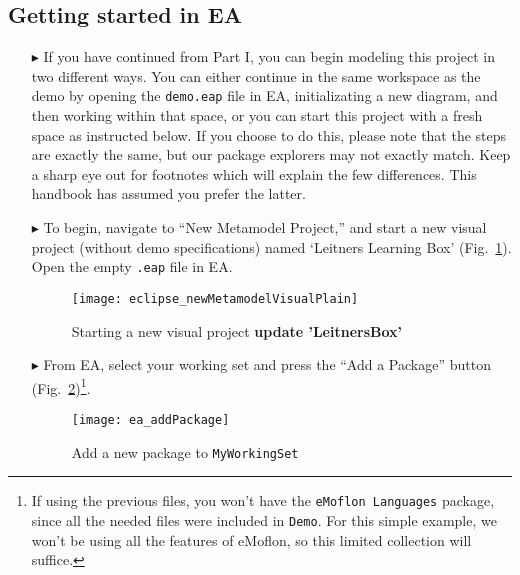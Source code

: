 \subsection{Getting started in EA}
\visHeader
\hypertarget{static:starting vis}{}

\begin{itemize}
\item[$\blacktriangleright$]  If you have continued from Part I, you can begin modeling this project in two different ways. You can either continue in the same
workspace as the demo by opening the \texttt{demo.eap} file in EA, initializating a new diagram, and then working within that space, or you can start this
project with a fresh space as instructed below. If you choose to do this, please note that the steps are exactly the same, but our package explorers may not
exactly match. Keep a sharp eye out for footnotes which will explain the few differences. This handbook has assumed you prefer the latter.

\item[$\blacktriangleright$]  To begin, navigate to ``New Metamodel Project,'' and start a new visual project (without demo specifications) named `Leitners
Learning Box' (Fig.~\ref{fig:new_visModel}). Open the empty \texttt{.eap} file in EA.

\begin{figure}[htbp]
	\centering
  \texttt{[image: eclipse\_newMetamodelVisualPlain]}
	\caption{Starting a new visual project {\bf update 'LeitnersBox'}}
	\label{fig:new_visModel}
\end{figure}

\newpage

\item[$\blacktriangleright$] From EA, select your working set and press the ``Add a Package'' button (Fig.~\ref{fig:new_package})\footnote{If using the previous
files, you won't have the \texttt{eMoflon Languages} package, since all the needed files were included in \texttt{Demo}. For this simple example, we won't be
using all the features of eMoflon, so this limited collection will suffice.}.

\begin{figure}[htbp]
	\centering
  \texttt{[image: ea\_addPackage]}
	\caption{Add a new package to \texttt{MyWorkingSet}}
	\label{fig:new_package}
	\vspace{0.5cm}
\end{figure}


\end{itemize}
